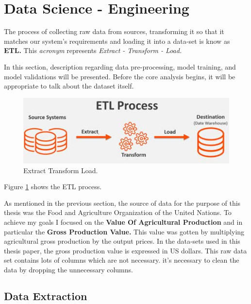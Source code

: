 \section{Data Science - Engineering}

The process of collecting raw data from sources, transforming it so that it matches our system's requirements and loading it into a data-set is know as \textbf{ETL.} This \textit{acronym} represents \textit{Extract - Transform - Load.}

In this section, description regarding data pre-processing, model training, and model validations will be presented. Before the core analysis begins, it will be appropriate to talk about the dataset itself.


\begin{figure}[h!]
	\includegraphics[width=\textwidth,height=\textheight,keepaspectratio]{fig/etl.jpg}
	\caption{Extract Transform Load.}
	\label{fig:ETL}
\end{figure}

Figure \ref{fig:ETL} shows the ETL process.

As mentioned in the previous section, the source of data for the purpose of this thesis was the Food and Agriculture Organization of the United Nations. To achieve my goals I focused on the \textbf{Value Of Agricultural Production} and in particular the \textbf{Gross Production Value.} This value was gotten by multiplying agricultural gross production by the output prices. In the data-sets used in this thesis paper, the gross production value is expressed in US dollars. This raw data set contains lots of columns which are not necessary. it's necessary to clean the data by dropping the unnecessary columns. 




\subsection{Data Extraction}


